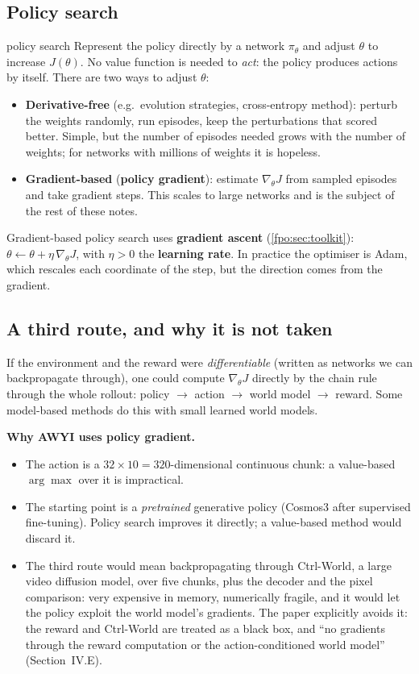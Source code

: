 \subsection{Policy search}
\begin{newc}{policy search}
Represent the policy directly by a network $\pi_\theta$ and adjust $\theta$ to increase $J(\theta)$. No value function is needed to \emph{act}: the policy produces actions by itself. There are two ways to adjust $\theta$:
\begin{itemize}[leftmargin=*]
\item \textbf{Derivative-free} (e.g.\ evolution strategies, cross-entropy method): perturb the weights randomly, run episodes, keep the perturbations that scored better. Simple, but the number of episodes needed grows with the number of weights; for networks with millions of weights it is hopeless.
\item \textbf{Gradient-based} (\textbf{policy gradient}): estimate $\nabla_\theta J$ from sampled episodes and take gradient steps. This scales to large networks and is the subject of the rest of these notes.
\end{itemize}
\end{newc}

Gradient-based policy search uses \textbf{gradient ascent} (\cref{fpo:sec:toolkit}): $\theta\leftarrow\theta+\eta\,\nabla_\theta J$, with $\eta>0$ the \textbf{learning rate}. In practice the optimiser is Adam, which rescales each coordinate of the step, but the direction comes from the gradient.

\subsection{A third route, and why it is not taken}
If the environment and the reward were \emph{differentiable} (written as networks we can backpropagate through), one could compute $\nabla_\theta J$ directly by the chain rule through the whole rollout: policy $\to$ action $\to$ world model $\to$ reward. Some model-based methods do this with small learned world models.
\begin{paperlink}
\textbf{Why AWYI uses policy gradient.}
\begin{itemize}[leftmargin=*]
\item The action is a $32\times10=320$-dimensional continuous chunk: a value-based $\arg\max$ over it is impractical.
\item The starting point is a \emph{pretrained} generative policy (Cosmos3 after supervised fine-tuning). Policy search improves it directly; a value-based method would discard it.
\item The third route would mean backpropagating through Ctrl-World, a large video diffusion model, over five chunks, plus the decoder and the pixel comparison: very expensive in memory, numerically fragile, and it would let the policy exploit the world model's gradients. The paper explicitly avoids it: the reward and Ctrl-World are treated as a black box, and ``no gradients through the reward computation or the action-conditioned world model'' (Section~IV.E).
\end{itemize}
\end{paperlink}

